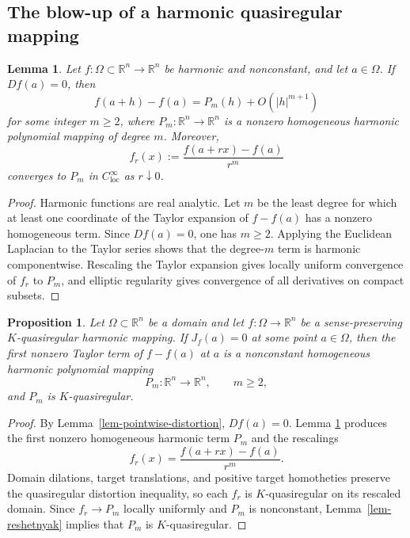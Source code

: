 \documentclass[10pt]{amsart}
\numberwithin{equation}{section}
\newtheorem{proposition}[theorem]{Proposition}
\newtheorem{lemma}[theorem]{Lemma}
\theoremstyle{definition}
\newcommand{\R}{\mathbb R}
\begin{document}
\subsection{The blow-up of a harmonic quasiregular mapping}

\begin{lemma}
\label{lem-analytic-blow-up}
Let \(f:\Omega\subset\R^n\to\R^n\) be harmonic and nonconstant, and let
\(a\in\Omega\). If \(Df(a)=0\), then
\[
        f(a+h)-f(a)=P_m(h)+O(|h|^{m+1})
\]
for some integer \(m\ge2\), where \(P_m:\R^n\to\R^n\) is a nonzero
homogeneous harmonic polynomial mapping of degree \(m\). Moreover,
\[
        f_r(x):=\frac{f(a+rx)-f(a)}{r^m}
\]
converges to \(P_m\) in \(C^\infty_{\operatorname{loc}}\) as \(r\downarrow0\).
\end{lemma}

\begin{proof}
Harmonic functions are real analytic. Let \(m\) be the least degree for which
at least one coordinate of the Taylor expansion of \(f-f(a)\) has a nonzero
homogeneous term. Since \(Df(a)=0\), one has \(m\ge2\). Applying the
Euclidean Laplacian to the Taylor series shows that the degree-\(m\) term is
harmonic componentwise. Rescaling the Taylor expansion gives locally uniform
convergence of \(f_r\) to \(P_m\), and elliptic regularity gives convergence
of all derivatives on compact subsets.
\end{proof}

\begin{proposition}
Let \(\Omega\subset\R^n\) be a domain and let \(f:\Omega\to\R^n\) be a
sense-preserving \(K\)-quasiregular harmonic mapping. If \(J_f(a)=0\) at
some point \(a\in\Omega\), then the first nonzero Taylor term of \(f-f(a)\)
at \(a\) is a nonconstant homogeneous harmonic polynomial mapping
\[
        P_m:\R^n\to\R^n,\qquad m\ge2,
\]
and \(P_m\) is \(K\)-quasiregular.
\end{proposition}

\begin{proof}
By Lemma~\ref{lem-pointwise-distortion}, \(Df(a)=0\). Lemma
\ref{lem-analytic-blow-up} produces the first nonzero homogeneous harmonic
term \(P_m\) and the rescalings
\[
        f_r(x)=\frac{f(a+rx)-f(a)}{r^m}.
\]
Domain dilations, target translations, and positive target homotheties
preserve the quasiregular distortion inequality, so each \(f_r\) is
\(K\)-quasiregular on its rescaled domain. Since \(f_r\to P_m\) locally
uniformly and \(P_m\) is nonconstant, Lemma~\ref{lem-reshetnyak} implies
that \(P_m\) is \(K\)-quasiregular.
\end{proof}
\end{document}
